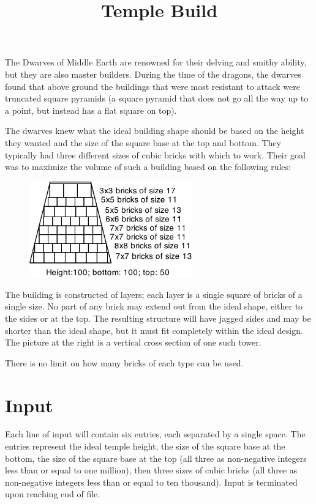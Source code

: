 \documentclass{article}
\title{Temple Build}
\date{}
\begin{document}
\maketitle

The Dwarves of Middle Earth are renowned for their delving and smithy
ability, but they are also master builders.  During the time of the dragons,
the dwarves found that above ground the buildings that were most resistant
to attack were truncated square pyramids (a square pyramid that does not go
all the way up to a point, but instead has a flat square on top).

The dwarves knew what the ideal building shape should be based on the height
they wanted and the size of the square base at the top and bottom.  They
typically had three different sizes of cubic bricks with which to work.
Their goal was to maximize the volume of such a building based on the following
rules:

\begin{figure}
\includegraphics[width=7cm]{pyr}
\end{figure}

  The building is constructed of layers; each layer is a single square of bricks
  of a single size.  No part of any brick may extend out from the ideal 
  shape, either to the sides or at the top.  The resulting structure will have
  jagged sides and may be shorter than the ideal shape, but it must fit
  completely within the ideal design.  The picture at the right is a
  vertical cross section of one such tower.
  
  There is no limit on how many bricks of each type can be used.
  


\section{Input}
Each line of input will contain six entries, each separated by a single space.
The entries represent the ideal temple height, the size of the square base at
the bottom, the size of the square base at the top (all three as non-negative
integers less than or equal to one million), then three sizes of cubic bricks (all three
as non-negative integers less than or equal to ten thousand).  Input is terminated upon
reaching end of file.
\end{document}
